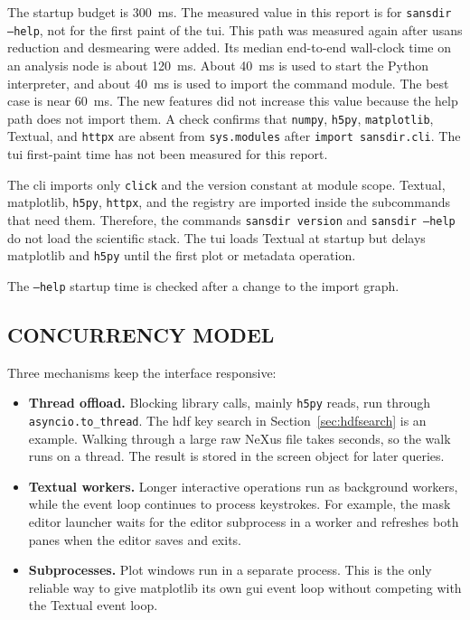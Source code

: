 \documentclass[tm]{ornltm}
\begin{document}
The startup budget is 300~ms. The measured value in this report is for
\texttt{sansdir --help}, not for the first paint of the \ac{tui}. This path was
measured again after \ac{usans} reduction and desmearing were added. Its median
end-to-end wall-clock time on an analysis node is about 120~ms. About 40~ms is
used to start the Python interpreter, and about 40~ms is used to import the
command module. The best case is near 60~ms. The new features did not increase
this value because the help path does not import them. A check confirms that
\texttt{numpy}, \texttt{h5py}, \texttt{matplotlib}, Textual, and \texttt{httpx}
are absent from \texttt{sys.modules} after \texttt{import sansdir.cli}. The
\ac{tui} first-paint time has not been measured for this report.

The \ac{cli} imports only \texttt{click} and the version constant at module
scope. Textual, matplotlib, \texttt{h5py}, \texttt{httpx}, and the registry are
imported inside the subcommands that need them. Therefore, the commands
\texttt{sansdir version} and \texttt{sansdir --help} do not load the scientific
stack. The \ac{tui} loads Textual at startup but delays matplotlib and
\texttt{h5py} until the first plot or metadata operation.

The \texttt{--help} startup time is checked after a change to the import graph.

\subsection{CONCURRENCY MODEL}

Three mechanisms keep the interface responsive:

\begin{itemize}
  \item \textbf{Thread offload.} Blocking library calls, mainly \texttt{h5py}
    reads, run through \texttt{asyncio.to\_thread}. The \ac{hdf} key search in
    Section~\ref{sec:hdfsearch} is an example. Walking through a large raw NeXus
    file takes seconds, so the walk runs on a thread. The result is stored in the
    screen object for later queries.
  \item \textbf{Textual workers.} Longer interactive operations run as
    background workers, while the event loop continues to process keystrokes.
    For example, the mask editor launcher waits for the editor subprocess in a
    worker and refreshes both panes when the editor saves and exits.
  \item \textbf{Subprocesses.} Plot windows run in a separate process. This is
    the only reliable way to give matplotlib its own \ac{gui} event loop without
    competing with the Textual event loop.
\end{itemize}
\end{document}
